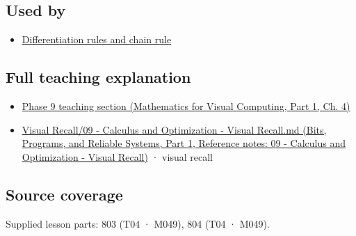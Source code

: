 \subsection{Used by}\label{appendix-fecc1847f5a3-used-by}

\hypertarget{appendix-fecc1847f5a3-used-by}{}

\begin{itemize}
\tightlist
\item
  \hyperref[appendix-d9f70bdfbc92]{Differentiation rules and chain rule}
\end{itemize}

\subsection{Full teaching explanation}\label{appendix-fecc1847f5a3-full-teaching-explanation}

\hypertarget{appendix-fecc1847f5a3-full-teaching-explanation}{}

\begin{itemize}
\tightlist
\item
  \href{../02-Mathematics-for-Visual-Computing-P01/main.pdf\#nameddest=01-foundations-i-ch020-functions-limits-continuity-and-scalar-change}{Phase 9 teaching section (Mathematics for Visual Computing, Part 1, Ch. 4)}
\item
  \href{../01-Bits-Programs-and-Reliable-Systems-P01/main.pdf\#nameddest=appendix-adf48f5dc5c1}{Visual Recall/09 - Calculus and Optimization - Visual Recall.md (Bits, Programs, and Reliable Systems, Part 1, Reference notes: 09 - Calculus and Optimization - Visual Recall)} · visual recall
\end{itemize}

\subsection{Source coverage}\label{appendix-fecc1847f5a3-source-coverage}

\hypertarget{appendix-fecc1847f5a3-source-coverage}{}

Supplied lesson parts: 803 (T04 · M049), 804 (T04 · M049).

